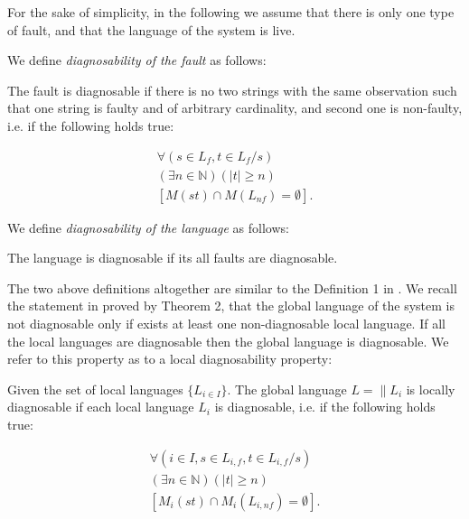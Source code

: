 \documentclass[a4paper, 10pt, conference]{ieeeconf}
\begin{document}
For the sake of simplicity, in the following we assume that there is only one
type of fault, and that the language of the system is live.

We define \emph{diagnosability of the fault} as follows:
\begin{definition} 
\label{def:fault_is_diag}
The fault is diagnosable if there is no two strings
with the same observation such that one string is faulty and of arbitrary
cardinality, and second one is non-faulty, i.e. if the following holds true:
\end{definition}
\begin{equation}
\begin{array}{l}
	\forall(s \in L_f, t \in L_f/s) 
	\\
	(\exists n \in \mathbb{N})
	(|t| \geq n) 
	\\
	\left[ M(st) \cap M(L_{nf}) = \emptyset \right].
\end{array}
\end{equation}

We define \emph{diagnosability of the language} as follows:
\begin{definition}
The language is diagnosable if its all faults are diagnosable.
\end{definition}
The two above definitions altogether are similar to the Definition 1 in
\cite{sampath_diagnosability_1995}. We recall the statement in
\cite{contant_diagnosability_2006} proved by Theorem 2, that the global
language of the system is not diagnosable only if exists at least one non-diagnosable
local language. If all the local languages are diagnosable then the global
language is diagnosable. We refer to this property as to a local diagnosability
property:

\begin{definition} Given the set of local languages
$\{L_{i \in I}\}$. The global language $L = \parallel L_i$ is
locally diagnosable if each local language $L_i$ is diagnosable, i.e. if
the following holds true:
\end{definition}
\begin{equation}
\begin{array}{l}
	\forall(i \in I, s \in L_{i,f}, t \in L_{i,f}/s)
	\\
	(\exists n \in \mathbb{N})
	(|t| \geq n)
	\\
	\left[ M_i(st) \cap M_i(L_{i,nf}) = \emptyset \right].
\end{array}
\end{equation}
\end{document}
